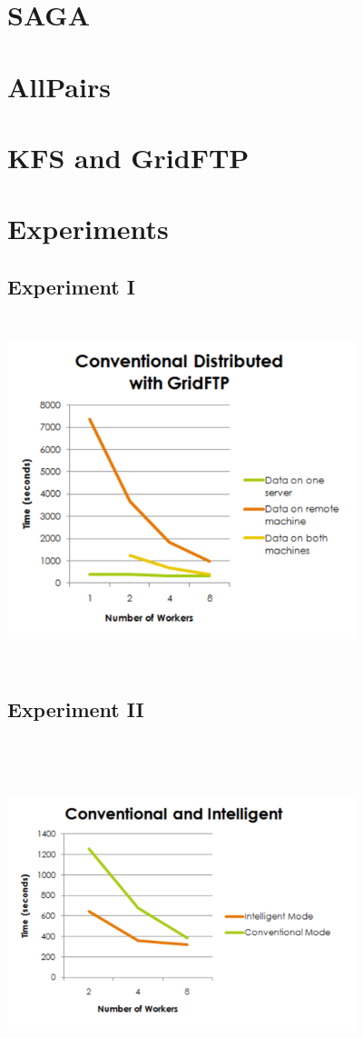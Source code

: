 \documentclass[a4paper,11pt]{article}
\begin{document}
\section{SAGA}
\section{AllPairs}
\section{KFS and GridFTP}
\section{Experiments}
\subsection{Experiment I}
\includegraphics[width=4in,height=4in]{ConventionalDistributed.pdf}
\subsection{Experiment II}
\includegraphics[width=4in,height=4in]{ConventionalIntelligent.pdf}
\end{document}
